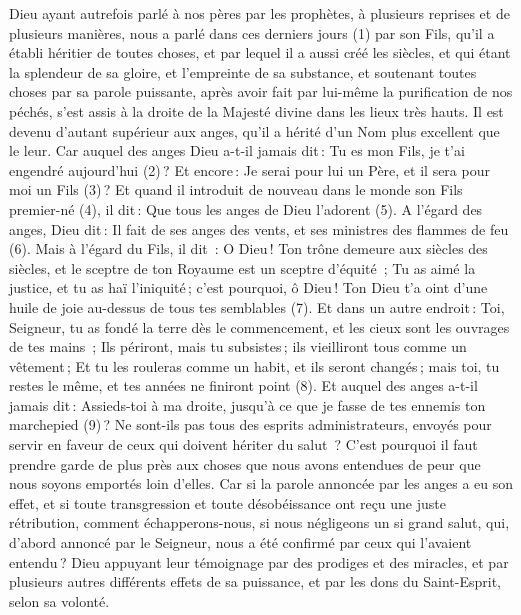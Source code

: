 \BFont
\begin{multicols}{2}
\VerseOne{}Dieu ayant autrefois parlé à nos pères par les prophètes, à plusieurs reprises et de plusieurs manières,
nous a parlé dans ces derniers jours (1) par son Fils, qu'il a établi héritier de toutes choses, et par lequel il a aussi créé les siècles,
et qui étant la splendeur de sa gloire, et l'empreinte de sa substance, et soutenant toutes choses par sa parole puissante, après avoir fait par lui-même la purification de nos péchés, s'est assis à la droite de la Majesté divine dans les lieux très hauts.
Il est devenu d'autant supérieur aux anges, qu'il a hérité d’un Nom plus excellent que le leur.
Car auquel des anges Dieu a-t-il jamais dit : Tu es mon Fils, je t'ai engendré aujourd'hui (2) ? Et encore : Je serai pour lui un Père, et il sera pour moi un Fils (3) ?
Et quand il introduit de nouveau dans le monde son Fils premier-né (4), il dit : Que tous les anges de Dieu l'adorent (5).
A l’égard des anges, Dieu dit : Il fait de ses anges des vents, et ses ministres des flammes de feu (6).
Mais à l’égard du Fils, il dit : O Dieu ! Ton trône demeure aux siècles des siècles, et le sceptre de ton Royaume est un sceptre d'équité ;
Tu as aimé la justice, et tu as haï l'iniquité ; c'est pourquoi, ô Dieu ! Ton Dieu t'a oint d'une huile de joie au-dessus de tous tes semblables (7).
Et dans un autre endroit : Toi, Seigneur, tu as fondé la terre dès le commencement, et les cieux sont les ouvrages de tes mains ;
Ils périront, mais tu subsistes ; ils vieilliront tous comme un vêtement ;
Et tu les rouleras comme un habit, et ils seront changés ; mais toi, tu restes le même, et tes années ne finiront point (8).
Et auquel des anges a-t-il jamais dit : Assieds-toi à ma droite, jusqu'à ce que je fasse de tes ennemis ton marchepied (9) ?
Ne sont-ils pas tous des esprits administrateurs, envoyés pour servir en faveur de ceux qui doivent hériter du salut ?
\VerseOne{}C'est pourquoi il faut prendre garde de plus près aux choses que nous avons entendues de peur que nous soyons emportés loin d’elles.
Car si la parole annoncée par les anges a eu son effet, et si toute transgression et toute désobéissance ont reçu une juste rétribution,
comment échapperons-nous, si nous négligeons un si grand salut, qui, d’abord annoncé par le Seigneur, nous a été confirmé par ceux qui l'avaient entendu ?
Dieu appuyant leur témoignage par des prodiges et des miracles, et par plusieurs autres différents effets de sa puissance, et par les dons du Saint-Esprit, selon sa volonté.

\end{multicols}
